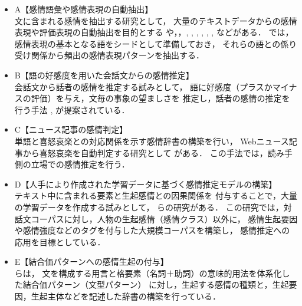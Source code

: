 \documentclass[japanese]{jnlp_1.3c}
\begin{document}
\begin{itemize}

\item {A【感情語彙や感情表現の自動抽出】}\\
文に含まれる感情を抽出する研究として，
大量のテキストデータからの感情表現や評価表現の自動抽出を目的とする
\cite{Nakayama}や，\cite{Kobayashi}，\cite{Kobayashi2}, \cite{Nasukawa}, \cite{Turney}, \cite{Kamps}, \cite{Kudo}, \cite{Fujimura}, \cite{Yano} などがある．
\cite{Nakayama}では，感情表現の基本となる語をシードとして準備しておき，
それらの語との係り受け関係から頻出の感情表現パターンを抽出する．

\item {B【語の好感度を用いた会話文からの感情推定】} \\
会話文から話者の感情を推定する試みとして，
語に好感度（プラスかマイナスの評価）を与え，文毎の事象の望ましさを
推定し，話者の感情の推定を行う手法 \cite{mera},\cite{mera2} が提案されている．

\item {C【ニュース記事の感情判定】} \\
単語と喜怒哀楽との対応関係を示す感情辞書の構築を行い，
Webニュース記事から喜怒哀楽を自動判定する研究として
\cite{Kumamoto}がある．
この手法では，読み手側の立場での感情推定を行う．

\item {D【人手により作成された学習データに基づく感情推定モデルの構築】}\\
テキスト中に含まれる要素と生起感情との因果関係を
付与することで，大量の学習データを作成する試みとして，
\cite{tokuhisa}らの研究がある．
この研究では，対話文コーパスに対し，人物の生起感情（感情クラス）以外に，
感情生起要因や感情強度などのタグを付与した大規模コーパスを構築し，
感情推定への応用を目標としている．

\item {E【結合価パターンへの感情生起の付与】}\\
\cite{TanakaTsutom}らは，
文を構成する用言と格要素（名詞＋助詞）の意味的用法を体系化した結合価パターン（文型パターン）
に対し，生起する感情の種類と，生起要因，生起主体などを記述した辞書の構築を行っている．

\end{itemize}
\end{document}
